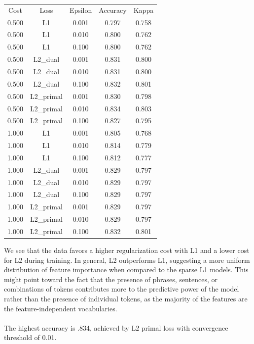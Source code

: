 \documentclass[9.5 pt]{article}
\begin{document}
\begin{minipage}[t]{0.6667\textwidth}
\setlength{\arrayrulewidth}{1mm}
\setlength{\tabcolsep}{12pt}
\renewcommand{\arraystretch}{1}
 
 

\begin{tabular}{||c c c c c||} 
\hline
\rowcolor{orange} \multicolumn{5}{|c|}{Parameter Grid: Logistic Regression} \\
\hline
\rowcolor{gray}
Cost & Loss & Epsilon & Accuracy & Kappa \\ \hline
0.500 & L1 & 0.001 & 0.797 & 0.758 \\ \hline
0.500 & L1 & 0.010 & 0.800 & 0.762 \\ \hline
0.500 & L1 & 0.100 & 0.800 & 0.762 \\ \hline
0.500 & L2\_dual & 0.001 & 0.831 & 0.800 \\ \hline
0.500 & L2\_dual & 0.010 & 0.831 & 0.800 \\ \hline
0.500 & L2\_dual & 0.100 & 0.832 & 0.801 \\ \hline
0.500 & L2\_primal & 0.001 & 0.830 & 0.798 \\ \hline
0.500 & L2\_primal & 0.010 & 0.834 & 0.803 \\ \hline
0.500 & L2\_primal & 0.100 & 0.827 & 0.795 \\ \hline
1.000 & L1 & 0.001 & 0.805 & 0.768 \\ \hline
1.000 & L1 & 0.010 & 0.814 & 0.779 \\ \hline
1.000 & L1 & 0.100 & 0.812 & 0.777 \\ \hline
1.000 & L2\_dual & 0.001 & 0.829 & 0.797 \\ \hline
1.000 & L2\_dual & 0.010 & 0.829 & 0.797 \\ \hline
1.000 & L2\_dual & 0.100 & 0.829 & 0.797 \\ \hline
1.000 & L2\_primal & 0.001 & 0.829 & 0.797 \\ \hline
1.000 & L2\_primal & 0.010 & 0.829 & 0.797 \\ \hline
1.000 & L2\_primal & 0.100 & 0.832 & 0.801 \\
\hline
\end{tabular}
\end{minipage}
\begin{minipage}[t]{0.3333\textwidth}
\hfill
\parbox{1.0\textwidth}{
We see that the data favors a higher regularization cost with L1 and a lower cost for L2 during training. In general, L2 outperforms L1, suggesting a more uniform distribution of feature importance when compared to the sparse L1 models. This might point toward the fact that the presence of phrases, sentences, or combinations of tokens contributes more to the predictive power of the model rather than the presence of individual tokens, as the majority of the features are the feature-independent vocabularies. \\ \\
The highest accuracy is .834, achieved by L2 primal loss with convergence threshold of 0.01.
}
\end{minipage}
\end{document}
